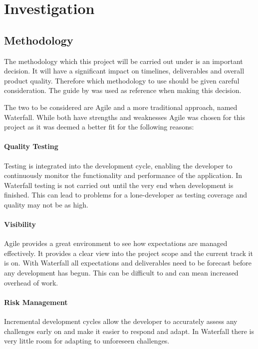 \section{Investigation}

\subsection{Methodology}
\label{subs:agile}

The methodology which this project will be carried out under is an important decision. It will have a significant impact on timelines, deliverables and overall product quality. Therefore which methodology to use should be given careful consideration. The guide by \citep{Manifesto2016} was used as reference when making this decision.

The two to be considered are Agile and a more traditional approach, named Waterfall. While both have strengths and weaknesses Agile was chosen for this project as it was deemed a better fit for the following reasons:

\paragraph{Quality Testing} Testing is integrated into the development cycle, enabling the developer to continuously monitor the functionality and performance of the application. In Waterfall testing is not carried out until the very end when development is finished. This can lead to problems for a lone-developer as testing coverage and quality may not be as high. 

\paragraph{Visibility} Agile provides a great environment to see how expectations are managed effectively. It provides a clear view into the project scope and the current track it is on. With Waterfall all expectations and deliverables need to be forecast before any development has begun. This can be difficult to and can mean increased overhead of work.

\paragraph{Risk Management} Incremental development cycles allow the developer to accurately assess any challenges early on and make it easier to respond and adapt. In Waterfall there is very little room for adapting to unforeseen challenges.


